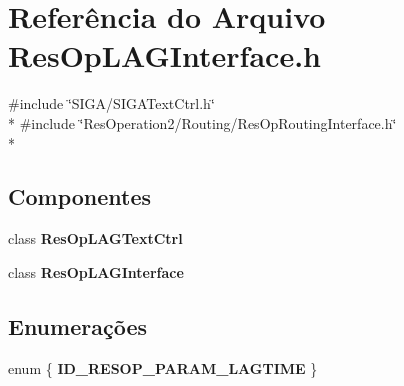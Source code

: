 \section{Referência do Arquivo Res\+Op\+L\+A\+G\+Interface.\+h}
\label{_res_op_l_a_g_interface_8h}
{\ttfamily \#include \char`\"{}S\+I\+G\+A/\+S\+I\+G\+A\+Text\+Ctrl.\+h\char`\"{}}\\*
{\ttfamily \#include \char`\"{}Res\+Operation2/\+Routing/\+Res\+Op\+Routing\+Interface.\+h\char`\"{}}\\*
\subsection*{Componentes}
\begin{DoxyCompactItemize}
\item 
class {\bf Res\+Op\+L\+A\+G\+Text\+Ctrl}
\item 
class {\bf Res\+Op\+L\+A\+G\+Interface}
\end{DoxyCompactItemize}
\subsection*{Enumerações}
\begin{DoxyCompactItemize}
\item 
enum \{ {\bf I\+D\+\_\+\+R\+E\+S\+O\+P\+\_\+\+P\+A\+R\+A\+M\+\_\+\+L\+A\+G\+T\+I\+ME}
 \}
\end{DoxyCompactItemize}

